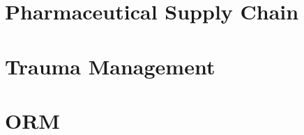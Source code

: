 \documentclass[12pt,a4paper,openright,twoside]{book}
\begin{document}
\chapter{Pharmaceutical Supply Chain}
\label{chap:val:irst}



\chapter{Trauma Management}
\label{chap:val:trauma}






\chapter{\acl{ORM}}
\label{chap:val:orm}



\label{chap:conclusion}





\backmatter



\end{document}
